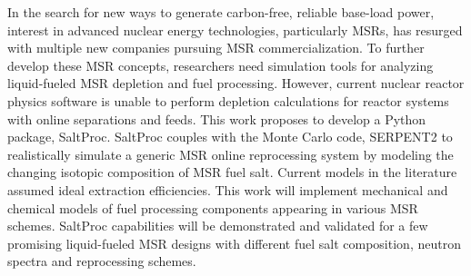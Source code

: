 In the search for new ways to generate carbon-free, reliable 
base-load power, interest in advanced nuclear energy technologies, 
particularly \glspl{MSR}, has resurged with multiple new companies 
pursuing \gls{MSR} commercialization. To further develop these \gls{MSR} 
concepts, researchers need simulation tools for analyzing liquid-fueled 
\gls{MSR} depletion and fuel processing. However, current nuclear reactor 
physics software is unable to perform depletion calculations for 
reactor systems with online separations and feeds. This work proposes to 
develop a Python package, SaltProc. SaltProc couples 
with the Monte Carlo code, SERPENT2 to realistically simulate a generic 
\gls{MSR} online reprocessing system by modeling the changing isotopic 
composition of \gls{MSR} fuel salt. Current models in the literature 
assumed ideal extraction efficiencies. This work will implement mechanical 
and chemical 
models of fuel processing components appearing in various 
\gls{MSR} schemes. 
SaltProc capabilities will be demonstrated and validated for a few 
promising liquid-fueled \gls{MSR} designs with different fuel salt 
composition, neutron spectra and reprocessing schemes.